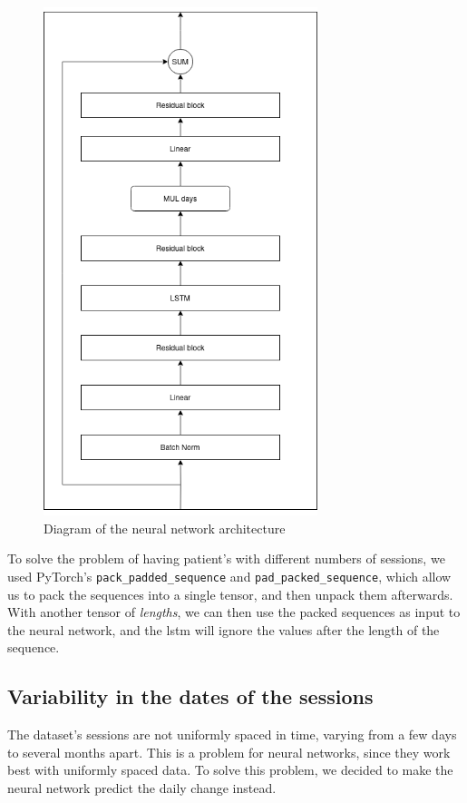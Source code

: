 \begin{figure}
    \centering
    \includegraphics[width=8cm]{files/nn_diagram}
    \caption{Diagram of the neural network architecture}
\end{figure}

To solve the problem of having patient's with different numbers of sessions, we
used PyTorch's \texttt{pack\_padded\_sequence} and
\texttt{pad\_packed\_sequence}, which allow us to pack the sequences into a
single tensor, and then unpack them afterwards. With another tensor of
\textit{lengths}, we can then use the packed sequences as input to the neural
network, and the \gls{lstm} will ignore the values after the length of the
sequence.

\subsection{Variability in the dates of the sessions}

The dataset's sessions are not uniformly spaced in time, varying from a few
days to several months apart. This is a problem for neural networks, since they
work best with uniformly spaced data. To solve this problem, we decided to make
the neural network predict the daily change instead.

